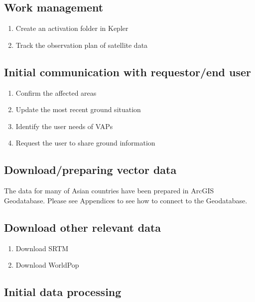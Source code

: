 \documentclass[]{book}
\providecommand{\tightlist}{%
  \setlength{\itemsep}{0pt}\setlength{\parskip}{0pt}}
\begin{document}
\subsection{Work management}\label{work-management}

\begin{enumerate}
\def\labelenumi{\arabic{enumi}.}
\tightlist
\item
  Create an activation folder in Kepler
\item
  Track the observation plan of satellite data
\end{enumerate}

\subsection{Initial communication with requestor/end
user}\label{initial-communication-with-requestorend-user}

\begin{enumerate}
\def\labelenumi{\arabic{enumi}.}
\tightlist
\item
  Confirm the affected areas
\item
  Update the most recent ground situation
\item
  Identify the user needs of VAPs
\item
  Request the user to share ground information
\end{enumerate}

\subsection{Download/preparing vector
data}\label{downloadpreparing-vector-data}

The data for many of Asian countries have been prepared in ArcGIS
Geodatabase. Please see Appendices to see how to connect to the
Geodatabase.

\subsection{Download other relevant
data}\label{download-other-relevant-data}

\begin{enumerate}
\def\labelenumi{\arabic{enumi}.}
\tightlist
\item
  Download SRTM
\item
  Download WorldPop
\end{enumerate}

\subsection{Initial data processing}\label{initial-data-processing}
\end{document}
